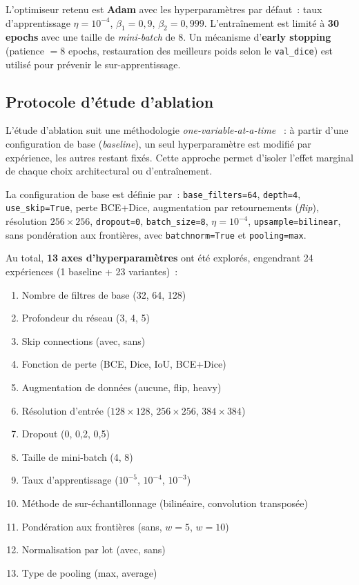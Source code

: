 \documentclass[12pt,a4paper]{article}
\begin{document}
L'optimiseur retenu est \textbf{Adam} \citep{kingma2015adam} avec les hyperparamètres par défaut~: taux d'apprentissage $\eta = 10^{-4}$, $\beta_1 = 0{,}9$, $\beta_2 = 0{,}999$. L'entraînement est limité à \textbf{30 epochs} avec une taille de \emph{mini-batch} de 8. Un mécanisme d'\textbf{early stopping} (patience $= 8$ epochs, restauration des meilleurs poids selon le \texttt{val\_dice}) est utilisé pour prévenir le sur-apprentissage.

\subsection{Protocole d'étude d'ablation}
\label{subsec:ablation_protocole}

L'étude d'ablation suit une méthodologie \og \emph{one-variable-at-a-time} \fg{}~: à partir d'une configuration de base (\emph{baseline}), un seul hyperparamètre est modifié par expérience, les autres restant fixés. Cette approche permet d'isoler l'effet marginal de chaque choix architectural ou d'entraînement.

La configuration de base est définie par~: \texttt{base\_filters=64}, \texttt{depth=4}, \texttt{use\_skip=True}, perte BCE+Dice, augmentation par retournements (\emph{flip}), résolution $256 \times 256$, \texttt{dropout=0}, \texttt{batch\_size=8}, $\eta = 10^{-4}$, \texttt{upsample=bilinear}, sans pondération aux frontières, avec \texttt{batchnorm=True} et \texttt{pooling=max}.

Au total, \textbf{13 axes d'hyperparamètres} ont été explorés, engendrant 24 expériences (1 baseline + 23 variantes)~:
\begin{enumerate}[nosep]
    \item Nombre de filtres de base (32, 64, 128)
    \item Profondeur du réseau (3, 4, 5)
    \item Skip connections (avec, sans)
    \item Fonction de perte (BCE, Dice, IoU, BCE+Dice)
    \item Augmentation de données (aucune, flip, heavy)
    \item Résolution d'entrée ($128 \times 128$, $256 \times 256$, $384 \times 384$)
    \item Dropout (0, 0{,}2, 0{,}5)
    \item Taille de mini-batch (4, 8)
    \item Taux d'apprentissage ($10^{-5}$, $10^{-4}$, $10^{-3}$)
    \item Méthode de sur-échantillonnage (bilinéaire, convolution transposée)
    \item Pondération aux frontières (sans, $w=5$, $w=10$)
    \item Normalisation par lot (avec, sans)
    \item Type de pooling (max, average)
\end{enumerate}
\end{document}

